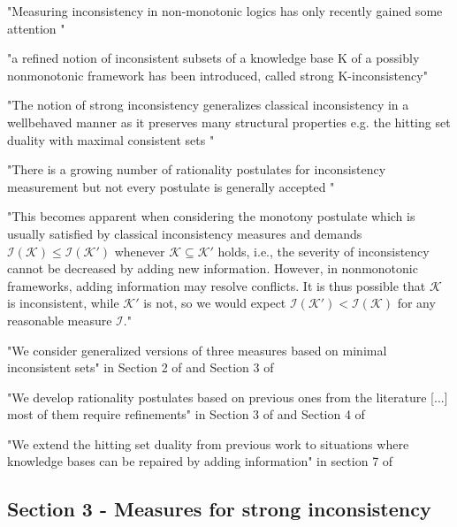 "Measuring inconsistency in non-monotonic logics has only recently gained some attention \cite{ulbricht_measuring_2018} \cite{brewka_strong_2019} \cite{michael_measuring_2016} \cite{brewka_strong_2017}"

"a refined notion of inconsistent subsets of a knowledge base K of a possibly nonmonotonic framework has been introduced, called strong K-inconsistency"
\cite{brewka_strong_2017}

"The notion of strong inconsistency generalizes classical inconsistency in a wellbehaved manner as it preserves many structural properties e.g. the hitting set duality with maximal consistent sets \cite{reiter_theory_1987}"

"There is a growing number of rationality postulates for inconsistency measurement but not every postulate is generally accepted \cite{hameurlain_basic_2017} \cite{ferme_revisiting_2014}"

"This becomes apparent when considering the monotony postulate which is usually satisfied by classical inconsistency measures and demands \(\mathcal{I}(\mathcal{K}) \leq \mathcal{I}(\mathcal{K}')\) whenever \(\mathcal{K} \subseteq \mathcal{K}'\) holds, i.e., the severity of inconsistency cannot be decreased by adding new information. However, in nonmonotonic frameworks, adding information may resolve conflicts. It is thus possible that \(\mathcal{K}\) is inconsistent, while \(\mathcal{K}'\) is not, so we would expect \(\mathcal{I}(\mathcal{K}') < \mathcal{I}(\mathcal{K})\) for any reasonable measure \(\mathcal{I}\)."

"We consider generalized versions of three measures based on minimal inconsistent sets" in Section 2 of \cite{ulbricht_measuring_2018} and Section 3 of \cite{ulbricht_handling_2020}

"We develop rationality postulates based on previous ones from the literature [...] most of them require refinements" in Section 3 of \cite{ulbricht_measuring_2018} and Section 4 of \cite{ulbricht_handling_2020}

"We extend the hitting set duality from previous work \cite{brewka_strong_2019} to situations where knowledge bases can be repaired by adding information" in section 7 of \cite{ulbricht_handling_2020}

\subsection{Section 3 - Measures for strong inconsistency}
\cite{ulbricht_handling_2020}

